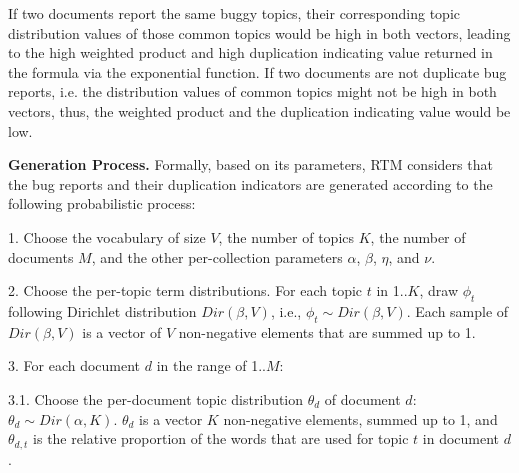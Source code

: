 If two documents report the same buggy topics, their corresponding
topic distribution values of those common topics would be high in both
vectors, leading to the high weighted product and high duplication
indicating value returned in the formula via the exponential function.
If two documents are not duplicate bug reports, i.e. the distribution
values of common topics might not be high in both vectors, thus, the
weighted product and the duplication indicating value would be low.


\vspace{0.03in}\noindent\textbf{Generation Process.}
Formally, based on its parameters, RTM considers that the bug reports
and their duplication indicators are generated according to the
following probabilistic process:


1. Choose the vocabulary of size $V$, the number of topics $K$, the
   number of documents $M$, and the other per-collection parameters
   $\alpha$, $\beta$, $\eta$, and $\nu$.

2. Choose the per-topic term distributions. For each topic $t$ in
1..$K$, draw $\phi_t$ following Dirichlet distribution
$Dir(\beta,V)$, i.e., $\phi_t \sim Dir(\beta,V)$. Each sample of
$Dir(\beta,V)$ is a vector of $V$ non-negative elements that are
summed up to 1.

3. For each document $d$ in the range of 1..$M$:

3.1. Choose the per-document topic distribution $\theta_d$ of document
     $d$: $\theta_d \sim Dir(\alpha, K)$. $\theta_d$ is a vector $K$
     non-negative elements, summed up to 1, and $\theta_{d,t}$ is the
     relative proportion of the words that are used for topic $t$ in
     document $d$.

